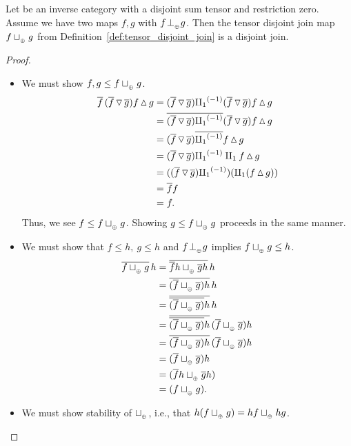 \begin{proposition}\label{prop:disjointness_tensor_gives_disjoint_join}
  Let \X be an inverse category with a disjoint sum tensor and restriction zero. Assume we have two
  maps $f,g$ with $f\tperp g$. Then the tensor disjoint join map $f \tjoin g$ from
  Definition~\ref{def:tensor_disjoint_join} is a disjoint join.
\end{proposition}
\begin{proof}
  \begin{itemize}
    \item [\axiom{DJ}{1}] We must show $f, g \le f \tjoin g$.
      \begin{align*}
        \rst{f}\,(\rst{f}\tjdown\rst{g})  f\tjup g
          &= (\rst{f}\tjdown\rst{g}) \icpa (\rst{f}\tjdown\rst{g} ) f\tjup g \\
        &=\rst{(\rst{f}\tjdown\rst{g}) \icpa} (\rst{f}\tjdown\rst{g}) f\tjup g  \\
        &=(\rst{f}\tjdown\rst{g}) \rst{\icpa} f\tjup g  \\
        &=(\rst{f}\tjdown\rst{g}) \icpa \cpa f\tjup g \\
        &=((\rst{f}\tjdown\rst{g}) \icpa) (\cpa (f \tjup g)) \\
        &= \rst{f} f \\
        &=f.
      \end{align*}
      Thus, we see $f \le f \tjoin g$. Showing $g \le f \tjoin g$ proceeds in the same manner.
    \item [\axiom{DJ}{2}] We must show that $f \le h,\ g\le h$ and $f\tperp g$ implies
      $f \tjoin g \le h$.
      \begin{align*}
        \rst{f \tjoin g} \,h & = \rst{\rst{f} h \tjoin \rst{g} h} \,h\\
        & = \rst{(\rst{f} \tjoin \rst{g})h} \,h\\
        & = \rst{\rst{(\rst{f} \tjoin \rst{g})}h} \,h\\
        & = \rst{\rst{(\rst{f} \tjoin \rst{g})}h}\,(\rst{f} \tjoin \rst{g})h\\
        & = \rst{(\rst{f} \tjoin \rst{g})h}\,(\rst{f} \tjoin \rst{g})h\\
        & = (\rst{f}\tjoin \rst{g})h\\
        & = (\rst{f}h\tjoin \rst{g}h)\\
        & = (f\tjoin g).
      \end{align*}
    \item [\axiom{DJ}{3}] We must show stability of $\tjoin$, i.e., that
      $h(f\tjoin g) = h f \tjoin h g$.


\end{itemize}
\end{proof}
